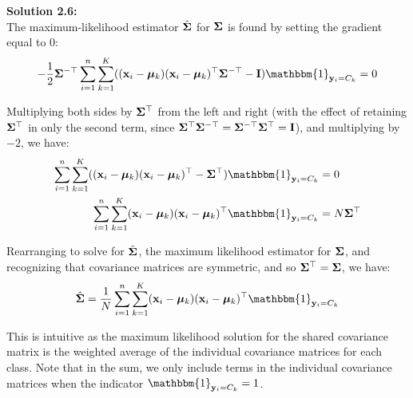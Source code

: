 \documentclass[submit]{harvardml}
\begin{document}
\noindent\textbf{Solution 2.6:}\\
The maximum-likelihood estimator $\hat {\mathbf{\Sigma}}$ for $\mathbf{\Sigma}$ is found by setting the gradient equal to 0:
\begin{align*}
    - \frac{1}{2} \bSigma^{-\top} \sum_{i=1}^{n} \sum_{k=1}^{K} ((\boldx_i - \bmu_k)(\boldx_i - \bmu_k)^{\top}\bSigma^{-\top} - \boldI) \mathbbm{1}_{\boldy_i = C_k} = 0
\end{align*}

Multiplying both sides by $\mathbf{\Sigma}^{\top}$ from the left and right (with the effect of
retaining $\mathbf{\Sigma}^{\top}$ in only the second term, since $\mathbf{\Sigma}^{\top} \mathbf{\Sigma}^{-\top} = \mathbf{\Sigma}^{-\top} \mathbf{\Sigma}^{\top} = \mathbf{I}$), and multiplying by $-2$, we have:
\begin{align*}
    \sum_{i=1}^{n} \sum_{k=1}^{K} ((\boldx_i - \bmu_k)(\boldx_i - \bmu_k)^{\top} - \bSigma^{\top}) \mathbbm{1}_{\boldy_i = C_k} &= 0\\
    \sum_{i=1}^{n} \sum_{k=1}^{K} (\boldx_i - \bmu_k)(\boldx_i - \bmu_k)^{\top} \mathbbm{1}_{\boldy_i = C_k} &= N \bSigma^{\top}
\end{align*}

Rearranging to solve for $\hat {\mathbf{\Sigma}}$, the maximum likelihood estimator for $\mathbf{\Sigma}$, and recognizing that covariance matrices are symmetric, and so
$\mathbf{\Sigma}^{\top} = \mathbf{\Sigma}$, we have:
\begin{align*}
    \hat \bSigma = \frac{1}{N} \sum_{i=1}^{n} \sum_{k=1}^{K} (\boldx_i - \bmu_k)(\boldx_i - \bmu_k)^{\top} \mathbbm{1}_{\boldy_i = C_k}
\end{align*}

This is intuitive as the maximum likelihood solution for the shared covariance matrix is the weighted average of the individual covariance matrices for each class. Note that in the sum, we only include terms in the individual covariance matrices when the indicator $\mathbbm{1}_{\boldy_i = C_k} = 1$.

\end{document}
